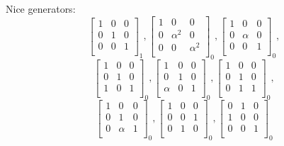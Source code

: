 Nice generators:\\
$$
\left[
\begin{array}{*{3}{r}}
1 & 0 & 0\\
0 & 1 & 0\\
0 & 0 & 1\\
\end{array}
\right]
_{1}
, 
\left[
\begin{array}{*{3}{r}}
1 & 0 & 0\\
0 & \alpha^{2} & 0\\
0 & 0 & \alpha^{2}\\
\end{array}
\right]
_{0}
, 
\left[
\begin{array}{*{3}{r}}
1 & 0 & 0\\
0 & \alpha  & 0\\
0 & 0 & 1\\
\end{array}
\right]
_{0}
, 
$$
$$
\left[
\begin{array}{*{3}{r}}
1 & 0 & 0\\
0 & 1 & 0\\
1 & 0 & 1\\
\end{array}
\right]
_{0}
, 
\left[
\begin{array}{*{3}{r}}
1 & 0 & 0\\
0 & 1 & 0\\
\alpha  & 0 & 1\\
\end{array}
\right]
_{0}
, 
\left[
\begin{array}{*{3}{r}}
1 & 0 & 0\\
0 & 1 & 0\\
0 & 1 & 1\\
\end{array}
\right]
_{0}
, 
$$
$$
\left[
\begin{array}{*{3}{r}}
1 & 0 & 0\\
0 & 1 & 0\\
0 & \alpha  & 1\\
\end{array}
\right]
_{0}
, 
\left[
\begin{array}{*{3}{r}}
1 & 0 & 0\\
0 & 0 & 1\\
0 & 1 & 0\\
\end{array}
\right]
_{0}
, 
\left[
\begin{array}{*{3}{r}}
0 & 1 & 0\\
1 & 0 & 0\\
0 & 0 & 1\\
\end{array}
\right]
_{0}
$$
